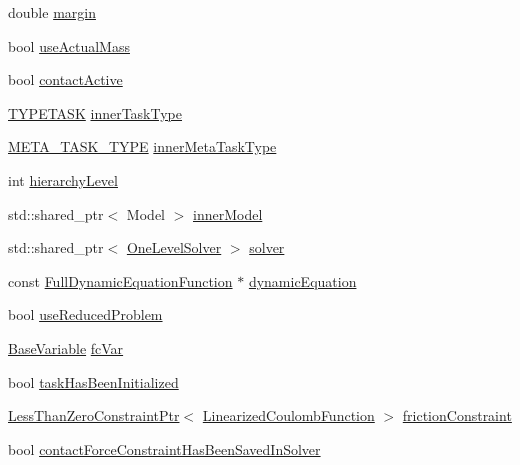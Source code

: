 \begin{DoxyCompactItemize}
\item 
double \hyperlink{structocra_1_1Task_1_1Pimpl_a8e92bd559918e4b01bcd235ad9e40a3a}{margin}
\item 
bool \hyperlink{structocra_1_1Task_1_1Pimpl_a33e37d9266902694f72be09c4c5db430}{use\+Actual\+Mass}
\item 
bool \hyperlink{structocra_1_1Task_1_1Pimpl_acf9fa37d987169c93362d793335e1cac}{contact\+Active}
\item 
\hyperlink{classocra_1_1Task_ad9d224cf787aa61c098f282efb78254a}{T\+Y\+P\+E\+T\+A\+SK} \hyperlink{structocra_1_1Task_1_1Pimpl_a576a2ffd53c10013b395d3430fe487ed}{inner\+Task\+Type}
\item 
\hyperlink{classocra_1_1Task_a8ddf2840d178ca273e886c9ca95248fe}{M\+E\+T\+A\+\_\+\+T\+A\+S\+K\+\_\+\+T\+Y\+PE} \hyperlink{structocra_1_1Task_1_1Pimpl_a74f9aa5427e6161018203a9e75da3bf4}{inner\+Meta\+Task\+Type}
\item 
int \hyperlink{structocra_1_1Task_1_1Pimpl_a16b28bba8d6425b4bc7375297dd2cd47}{hierarchy\+Level}
\item 
std\+::shared\+\_\+ptr$<$ Model $>$ \hyperlink{structocra_1_1Task_1_1Pimpl_a6a98b6fb3efab282ba6d5092245b36d1}{inner\+Model}
\item 
std\+::shared\+\_\+ptr$<$ \hyperlink{classocra_1_1OneLevelSolver}{One\+Level\+Solver} $>$ \hyperlink{structocra_1_1Task_1_1Pimpl_af1e09ed90ae5dee85e7fb5bd9d959df7}{solver}
\item 
const \hyperlink{classocra_1_1FullDynamicEquationFunction}{Full\+Dynamic\+Equation\+Function} $\ast$ \hyperlink{structocra_1_1Task_1_1Pimpl_ae0ea7e23e7027d49ab4f7b9e4bac4e77}{dynamic\+Equation}
\item 
bool \hyperlink{structocra_1_1Task_1_1Pimpl_a3212017ae655edc8559498c773f0285f}{use\+Reduced\+Problem}
\item 
\hyperlink{classocra_1_1BaseVariable}{Base\+Variable} \hyperlink{structocra_1_1Task_1_1Pimpl_ae95e699c5e631e1ec4e6d887b800f322}{fc\+Var}
\item 
bool \hyperlink{structocra_1_1Task_1_1Pimpl_a40e20271ee922933345e452f26569ac1}{task\+Has\+Been\+Initialized}
\item 
\hyperlink{classocra_1_1LessThanZeroConstraintPtr}{Less\+Than\+Zero\+Constraint\+Ptr}$<$ \hyperlink{classocra_1_1LinearizedCoulombFunction}{Linearized\+Coulomb\+Function} $>$ \hyperlink{structocra_1_1Task_1_1Pimpl_a311170ea86291b3d4fe9b9f1cd40e0a8}{friction\+Constraint}
\item 
bool \hyperlink{structocra_1_1Task_1_1Pimpl_abcedfdc974f594cd0c583c2e25eda984}{contact\+Force\+Constraint\+Has\+Been\+Saved\+In\+Solver}

\end{DoxyCompactItemize}
